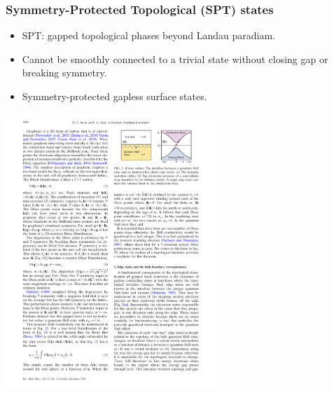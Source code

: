 \documentclass[xcolor=table, aspectratio=169,ignorenonframetext]{beamer}
\begin{document}
\begin{frame}
  \frametitle{Symmetry-Protected Topological (SPT) states}
\begin{itemize}
\item SPT: gapped topological phases beyond Landau paradiam.
\item Cannot be smoothly connected to a trivial state without closing gap or breaking symmetry.
\item Symmetry-protected gapless surface states.
\end{itemize}
\begin{center}
		\includegraphics[width=8cm]{../spspt/qhe_edge}
\end{center}
\end{frame}
\end{document}
